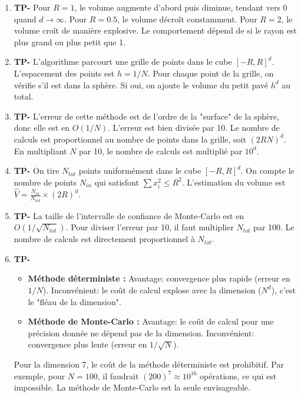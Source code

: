 \documentclass[solutions]{exercices}
\begin{document}
\begin{solution}
\begin{enumerate}
    \item \textbf{TP-} Pour $R=1$, le volume augmente d'abord puis diminue, tendant vers 0 quand $d \to \infty$. Pour $R=0.5$, le volume décroît constamment. Pour $R=2$, le volume croît de manière explosive. Le comportement dépend de si le rayon est plus grand ou plus petit que 1.
    \item \textbf{TP-} L'algorithme parcourt une grille de points dans le cube $[-R, R]^d$. L'espacement des points est $h=1/N$. Pour chaque point de la grille, on vérifie s'il est dans la sphère. Si oui, on ajoute le volume du petit pavé $h^d$ au total.
    \item \textbf{TP-} L'erreur de cette méthode est de l'ordre de la "surface" de la sphère, donc elle est en $O(1/N)$. L'erreur est bien divisée par 10. Le nombre de calculs est proportionnel au nombre de points dans la grille, soit $(2RN)^d$. En multipliant $N$ par 10, le nombre de calculs est multiplié par $10^d$.
    \item \textbf{TP-} On tire $N_{tot}$ points uniformément dans le cube $[-R,R]^d$. On compte le nombre de points $N_{in}$ qui satisfont $\sum x_i^2 \le R^2$. L'estimation du volume est $\hat{V} = \frac{N_{in}}{N_{tot}} \times (2R)^d$.
    \item \textbf{TP-} La taille de l'intervalle de confiance de Monte-Carlo est en $O(1/\sqrt{N_{tot}})$. Pour diviser l'erreur par 10, il faut multiplier $N_{tot}$ par 100. Le nombre de calculs est directement proportionnel à $N_{tot}$.
    \item \textbf{TP-}
    \begin{itemize}
        \item \textbf{Méthode déterministe :} Avantage: convergence plus rapide (erreur en $1/N$). Inconvénient: le coût de calcul explose avec la dimension ($N^d$), c'est le "fléau de la dimension".
        \item \textbf{Méthode de Monte-Carlo :} Avantage: le coût de calcul pour une précision donnée ne dépend pas de la dimension. Inconvénient: convergence plus lente (erreur en $1/\sqrt{N}$).
    \end{itemize}
    Pour la dimension 7, le coût de la méthode déterministe est prohibitif. Par exemple, pour $N=100$, il faudrait $(200)^7 \approx 10^{16}$ opérations, ce qui est impossible. La méthode de Monte-Carlo est la seule envisageable.
\end{enumerate}
\end{solution}
\end{document}
